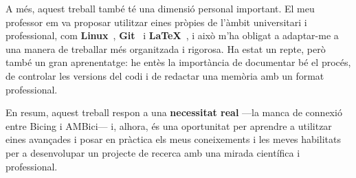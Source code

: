 A més, aquest treball també té una dimensió personal important.
El meu professor em va proposar utilitzar eines pròpies de l’àmbit universitari i professional, com \textbf{Linux}~\cite{linux-foundation}, \textbf{Git}~\cite{github} i \textbf{LaTeX}~\cite{latex-project}, i això m’ha obligat a adaptar-me a una manera de treballar més organitzada i rigorosa.
Ha estat un repte, però també un gran aprenentatge: he entès la importància de documentar bé el procés, de controlar les versions del codi i de redactar una memòria amb un format professional.

En resum, aquest treball respon a una \textbf{necessitat real} —la manca de connexió entre Bicing i AMBici— i, alhora, és una oportunitat per aprendre a utilitzar eines avançades i posar en pràctica els meus coneixements i les meves habilitats per a desenvolupar un projecte de recerca amb una mirada científica i professional.

